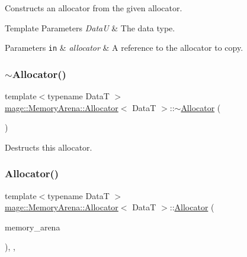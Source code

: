 Constructs an allocator from the given allocator.


\begin{DoxyTemplParams}{Template Parameters}
{\em DataU} & The data type. \\
\hline
\end{DoxyTemplParams}

\begin{DoxyParams}[1]{Parameters}
\mbox{\tt in}  & {\em allocator} & A reference to the allocator to copy. \\
\hline
\end{DoxyParams}
\hypertarget{structmage_1_1_memory_arena_1_1_allocator_a3324ead39d8cdfb8a119425879101e0a}{}\label{structmage_1_1_memory_arena_1_1_allocator_a3324ead39d8cdfb8a119425879101e0a} 
\subsubsection{\texorpdfstring{$\sim$\+Allocator()}{~Allocator()}}
{\footnotesize\ttfamily template$<$typename DataT $>$ \\
\hyperlink{structmage_1_1_memory_arena_1_1_allocator}{mage\+::\+Memory\+Arena\+::\+Allocator}$<$ DataT $>$\+::$\sim$\hyperlink{structmage_1_1_memory_arena_1_1_allocator}{Allocator} (\begin{DoxyParamCaption}{ }\end{DoxyParamCaption})\hspace{0.3cm}{\ttfamily [default]}}

Destructs this allocator. \hypertarget{structmage_1_1_memory_arena_1_1_allocator_a10a6ea82aab121d4e04efa004a49910b}{}\label{structmage_1_1_memory_arena_1_1_allocator_a10a6ea82aab121d4e04efa004a49910b} 
\subsubsection{\texorpdfstring{Allocator()}{Allocator()}\hspace{0.1cm}{\footnotesize\ttfamily [4/4]}}
{\footnotesize\ttfamily template$<$typename DataT $>$ \\
\hyperlink{structmage_1_1_memory_arena_1_1_allocator}{mage\+::\+Memory\+Arena\+::\+Allocator}$<$ DataT $>$\+::\hyperlink{structmage_1_1_memory_arena_1_1_allocator}{Allocator} (\begin{DoxyParamCaption}\item[{\hyperlink{classmage_1_1_memory_arena}{Memory\+Arena} $\ast$}]{memory\+\_\+arena }\end{DoxyParamCaption})\hspace{0.3cm}{\ttfamily [explicit]}, {\ttfamily [private]}, {\ttfamily [noexcept]}}

